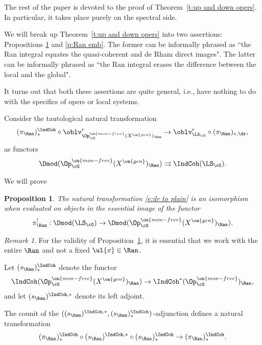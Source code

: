 \documentclass[9pt]{amsart}
\newtheorem{prop}[subsubsection]{Proposition}
\theoremstyle{remark}
\newtheorem{rem}[subsubsection]{Remark}
\theoremstyle{definition}
\theoremstyle{remark}
\newcommand{\thmref}[1]{Theorem~\ref{#1}}
\newcommand{\propref}[1]{Proposition~\ref{#1}}
\numberwithin{equation}{section}
\begin{document}
The rest of the paper is devoted to the proof of \thmref{t:up and down opers}. In particular, 
it takes place purely on the spectral side. 

\medskip

We will break up \thmref{t:up and down opers} into two assertions: Propositions \ref{p:dr to plain}
and \ref{p:Ran emb}. The former can be informally phrased as ``the Ran integral equates the quasi-coherent
and de Rham direct images". The latter can be informally phrased as ``the Ran integral erases the 
difference between the local and the global". 

\medskip

It turns out that both these assertions are quite general, i.e., have nothing to do with the specifics of
opers or local systems. 


\sssec{} \label{sss:dr to plain}

Consider the tautological natural transformation
\begin{equation} \label{e:dr to plain}
(\pi_\Ran)^{\IndCoh}_*\circ \oblv_{\Op^{\on{mon-free}}_\cG(X^{\on{gen}})_\Ran}^r\to 
\oblv^r_{\LS_\cG}\circ (\pi_\Ran)_{*,\dr},
\end{equation}
as functors
$$\Dmod(\Op^{\on{mon-free}}_\cG(X^{\on{gen}})_\Ran)\rightrightarrows \IndCoh(\LS_\cG).$$

We will prove
\begin{prop} \label{p:dr to plain}
The natural transformation \eqref{e:dr to plain} is an isomorphism when evaluated on objects
in the essential image of the functor
$$\pi^!_\Ran:\Dmod(\LS_\cG)\to \Dmod(\Op^{\on{mon-free}}_\cG(X^{\on{gen}})_\Ran).$$
\end{prop}

\begin{rem}
For the validity of \propref{p:dr to plain}, it is essential that we work with the entire $\Ran$
and not a fixed $\ul{x}\in \Ran$.
\end{rem}

\sssec{}

Let $(s_\Ran)^{\IndCoh}_*$ denote the functor
$$\IndCoh(\Op^{\on{mon-free}}_\cG(X^{\on{gen}})_\Ran)\to \IndCoh^*(\Op^{\on{mon-free}}_\cG)_\Ran,$$
and let  $(s_\Ran)^{\IndCoh,*}$ denote its left adjoint.

\medskip

The counit of the $((s_\Ran)^{\IndCoh,*},(s_\Ran)^{\IndCoh}_*)$-adjunction defines a natural transformation 
\begin{equation} \label{e:Ran emb}
(\pi_\Ran)^{\IndCoh}_*\circ (s_\Ran)^{\IndCoh,*}\circ (s_\Ran)^{\IndCoh}_*\to (\pi_\Ran)^{\IndCoh}_*.
\end{equation}
\end{document}

